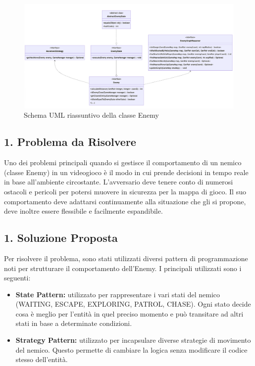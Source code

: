 \documentclass[a4paper,12pt]{report}
\begin{document}
\begin{figure}[h]
\centering{}
\includegraphics[width=\textwidth]{report-src/img/enemyGenerics.png}
\caption{Schema UML riassuntivo della classe Enemy}
\end{figure}

\subsection*{1. Problema da Risolvere}
\par
Uno dei problemi principali quando si gestisce il comportamento di un nemico (classe Enemy) in un videogioco è il modo in cui prende decisioni in tempo reale in base all'ambiente circostante. L’avversario deve tenere conto di numerosi ostacoli e pericoli per potersi muovere in sicurezza per la mappa di gioco. Il suo comportamento deve adattarsi continuamente alla situazione che gli si propone, deve inoltre essere flessibile e facilmente espandibile. 

\subsection*{1. Soluzione Proposta}
Per risolvere il problema, sono stati utilizzati diversi pattern di programmazione noti per strutturare il comportamento dell'Enemy. I principali utilizzati sono i seguenti:
\begin{itemize}
 \item \textbf{State Pattern:} utilizzato per rappresentare i vari stati del nemico (WAITING, ESCAPE, EXPLORING, PATROL, CHASE). Ogni stato decide cosa è meglio per l’entità in quel preciso momento e può transitare ad altri stati in base a determinate condizioni.
 \item \textbf{Strategy Pattern:} utilizzato per incapsulare diverse strategie di movimento del nemico. Questo permette di cambiare la logica senza modificare il codice stesso dell’entità.
\end{itemize}
\end{document}
